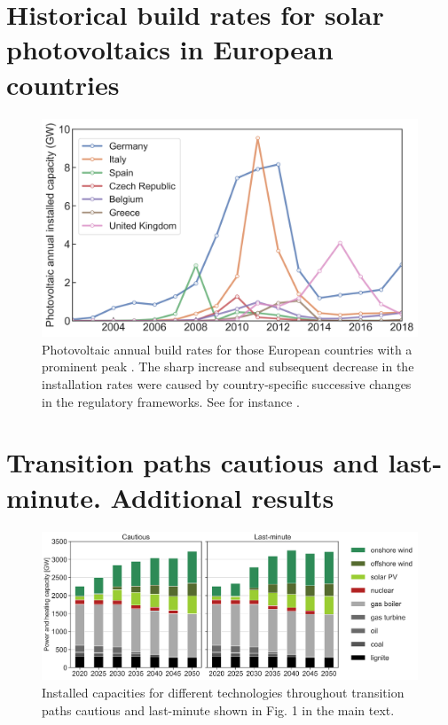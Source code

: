 \documentclass[3p]{elsarticle} %
\begin{document}
\section{Historical build rates for solar photovoltaics in European countries}

\begin{figure}[!h]
\centering
\includegraphics[width=12cm]{figures/installation_rates_PV.png}
\caption{Photovoltaic annual build rates for those European countries with a prominent peak \cite{IRENA_2019}. The sharp increase and subsequent decrease in the installation rates were caused by country-specific successive changes in the regulatory frameworks. See for instance \cite{Report_Fraunhofer_2019, Victoria_2012}. } \label{fig_installation_rates_PV} 
\end{figure}
 


\section{Transition paths cautious and last-minute. Additional results}

\begin{figure}[!h]
	\centering
	\includegraphics[width=12cm]{figures/installed_capacity.png}
	\caption{Installed capacities for different technologies throughout transition paths cautious and last-minute shown in Fig. 1 in the main text.} \label{fig_installed_capacity} 
\end{figure}
\end{document}
